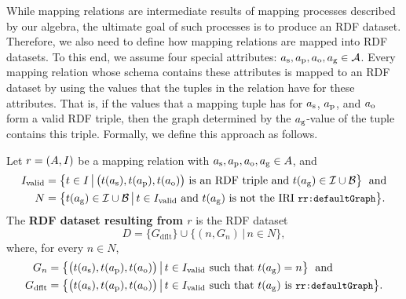 While mapping relations are
intermediate results of mapping processes described by our algebra, the ultimate goal of
such processes
is to produce an RDF dataset. Therefore, we also need to define how mapping relations are mapped into RDF datasets. To this end, we assume four special attributes: $a_\textrm{s},a_\textrm{p},a_\textrm{o},a_\textrm{g} \in \mathcal{A}$. Every mapping relation whose schema contains these attributes is mapped to an RDF dataset
by using the values that the tuples in the relation have for these attributes. That is, if the values that a mapping tuple has for $a_\textrm{s}$, $a_\textrm{p}$, and $a_\textrm{o}$ form a valid RDF triple, then the graph determined by the $a_\textrm{g}$-value of the tuple contains this triple. Formally, we define this approach as follows.

\begin{definition}
	\label{def:generated_dataset}
	\normalfont
	Let $r = (A, I)$ be a mapping relation with $a_\textrm{s}, a_\textrm{p}, a_\textrm{o}, a_\textrm{g} \in A$, and
	\begin{align*}
		I_\mathrm{valid}
		 & =
		\bigl\{
		t \in I
		\,\big|\,
		\bigl( t(a_\textrm{s}), t(a_\textrm{p}), t(a_\textrm{o}) \bigr) \text{ is an RDF triple and } t(a_\textrm{g}) \in \mathcal{I}\cup\mathcal{B}
		\bigr\}
		\; \text{ and}
		\\
		N
		 & =
		\bigl\{ t(a_\textrm{g}) \in \mathcal{I}\cup\mathcal{B} \,\big|\, t \in I_\mathrm{valid} \text{ and $t(a_\textrm{g})$ is not the IRI } \texttt{\small rr:defaultGraph} \bigr\}
		.
	\end{align*}
	The \textbf{RDF dataset resulting from $r$} is the RDF dataset
	\begin{equation*}
		D =
		\{ G_\mathrm{dflt} \}
		\cup
		\bigl\{
		( n, G_n )
		\,\big|\,
		n \in N
		\bigr\}
		,
	\end{equation*}
	where, for every $n \in N$,
	\begin{align*}
		G_n             & =
		\bigl\{
		\bigl( t(a_\textrm{s}), t(a_\textrm{p}), t(a_\textrm{o}) \bigr)
		\,\big|\,
		t \in I_\mathrm{valid} \text{ such that } t(a_\textrm{g})=n
		\bigr\}
		\; \text{ and}
		\\
		G_\mathrm{dflt} & =
		\bigl\{
		\bigl( t(a_\textrm{s}), t(a_\textrm{p}), t(a_\textrm{o}) \bigr)
		\,\big|\,
		t \in I_\mathrm{valid} \text{ such that } t(a_\textrm{g}) \text{ is } \texttt{\small rr:defaultGraph}
		\bigr\}
		.
	\end{align*}
\end{definition}

